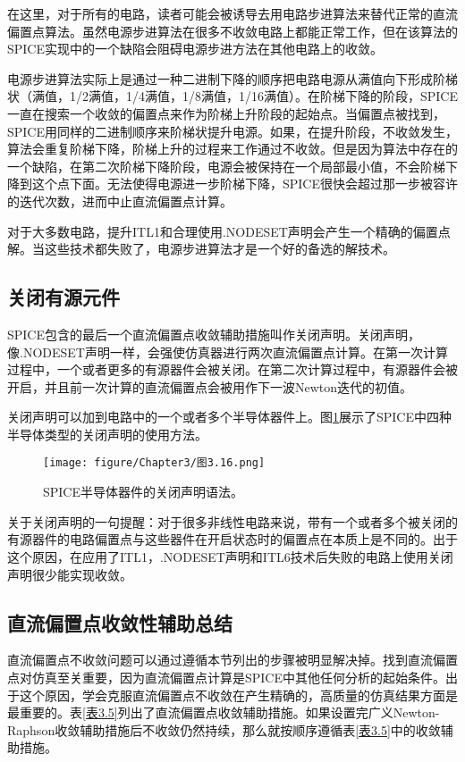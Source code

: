 在这里，对于所有的电路，读者可能会被诱导去用电路步进算法来替代正常的直流偏置点算法。虽然电源步进算法在很多不收敛电路上都能正常工作，但在该算法的SPICE实现中的一个缺陷会阻碍电源步进方法在其他电路上的收敛。

电源步进算法实际上是通过一种二进制下降的顺序把电路电源从满值向下形成阶梯状（满值，1/2满值，1/4满值，1/8满值，1/16满值）。在阶梯下降的阶段，SPICE一直在搜索一个收敛的偏置点来作为阶梯上升阶段的起始点。当偏置点被找到，SPICE用同样的二进制顺序来阶梯状提升电源。如果，在提升阶段，不收敛发生，算法会重复阶梯下降，阶梯上升的过程来工作通过不收敛。但是因为算法中存在的一个缺陷，在第二次阶梯下降阶段，电源会被保持在一个局部最小值，不会阶梯下降到这个点下面。无法使得电源进一步阶梯下降，SPICE很快会超过那一步被容许的迭代次数，进而中止直流偏置点计算。

对于大多数电路，提升ITL1和合理使用.NODESET声明会产生一个精确的偏置点解。当这些技术都失败了，电源步进算法才是一个好的备选的解技术。

\subsection{关闭有源元件}
SPICE包含的最后一个直流偏置点收敛辅助措施叫作关闭声明。关闭声明，像.NODESET声明一样，会强使仿真器进行两次直流偏置点计算。在第一次计算过程中，一个或者更多的有源器件会被关闭。在第二次计算过程中，有源器件会被开启，并且前一次计算的直流偏置点会被用作下一波Newton迭代的初值。

关闭声明可以加到电路中的一个或者多个半导体器件上。图\ref{图3.16}展示了SPICE中四种半导体类型的关闭声明的使用方法。

\begin{figure}[htbp]
\small
    \centering
    \texttt{[image: figure/Chapter3/图3.16.png]}
    \caption{SPICE半导体器件的关闭声明语法。}
    \label{图3.16}
\end{figure}

关于关闭声明的一句提醒：对于很多非线性电路来说，带有一个或者多个被关闭的有源器件的电路偏置点与这些器件在开启状态时的偏置点在本质上是不同的。出于这个原因，在应用了ITL1，.NODESET声明和ITL6技术后失败的电路上使用关闭声明很少能实现收敛。

\subsection{直流偏置点收敛性辅助总结}
直流偏置点不收敛问题可以通过遵循本节列出的步骤被明显解决掉。找到直流偏置点对仿真至关重要，因为直流偏置点计算是SPICE中其他任何分析的起始条件。出于这个原因，学会克服直流偏置点不收敛在产生精确的，高质量的仿真结果方面是最重要的。表\ref{表3.5}列出了直流偏置点收敛辅助措施。如果设置完广义Newton-Raphson收敛辅助措施后不收敛仍然持续，那么就按顺序遵循表\ref{表3.5}中的收敛辅助措施。

